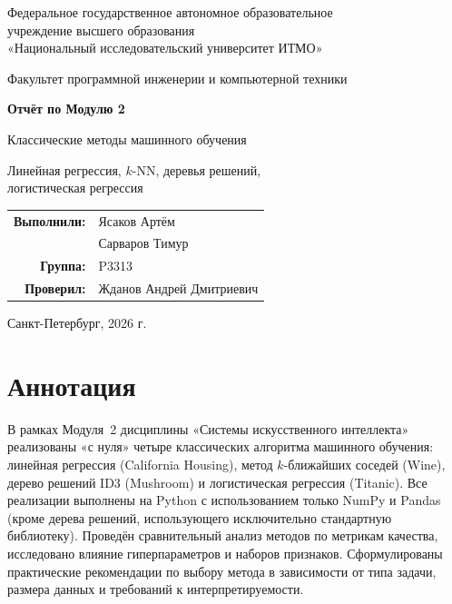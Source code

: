 \documentclass[12pt,a4paper]{article}
\newcommand{\AuthorA}{Ясаков Артём}
\newcommand{\AuthorB}{Сарваров Тимур}
\newcommand{\Group}{P3313}
\newcommand{\Teacher}{Жданов Андрей Дмитриевич}
\begin{document}
\begin{titlepage}\centering
{\large Федеральное государственное автономное образовательное\\
учреждение высшего образования\\
«Национальный исследовательский университет ИТМО»\par}
{\large Факультет программной инженерии и компьютерной техники\par}
\vspace{2.5cm}
{\Huge\bfseries Отчёт по Модулю 2\par}
\vspace{0.4cm}
{\Large Классические методы машинного обучения\par}
\vspace{0.4cm}
{\Large Линейная регрессия, \(k\)-NN, деревья решений,\\
логистическая регрессия\par}
\vspace{3.5cm}
\begin{flushright}
\begin{tabular}{rl}
    \textbf{Выполнили:} & \AuthorA \\
                        & \AuthorB \\[6pt]
    \textbf{Группа:}    & \Group \\[12pt]
    \textbf{Проверил:}  & \Teacher \\
\end{tabular}
\end{flushright}
\vfill
{\large Санкт-Петербург, 2026 г.\par}
\end{titlepage}

\tableofcontents
\newpage

\section*{Аннотация}

В рамках Модуля~2 дисциплины «Системы искусственного интеллекта»
реализованы «с нуля» четыре классических алгоритма машинного обучения:
линейная регрессия (California Housing), метод \(k\)-ближайших соседей
(Wine), дерево решений ID3 (Mushroom) и логистическая регрессия
(Titanic). Все реализации выполнены на Python с использованием только
NumPy и Pandas (кроме дерева решений, использующего исключительно
стандартную библиотеку). Проведён сравнительный анализ методов по
метрикам качества, исследовано влияние гиперпараметров и наборов
признаков. Сформулированы практические рекомендации по выбору метода
в зависимости от типа задачи, размера данных и требований
к интерпретируемости.
\end{document}
